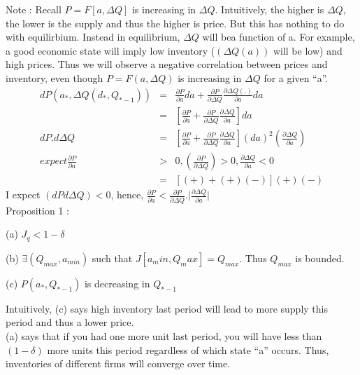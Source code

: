 Note : Recall $P=F[a, \Delta Q]$ is increasing in $\Delta Q$. Intuitively, the higher is $\Delta Q$, the lower is the supply and thus the higher is price. But this has nothing to do with equilirbium. Instead in equilibrium, $\Delta Q$ will bea function of a. For example, a good economic state will imply low inventory ($(\Delta Q(a))$ will be low) and high prices. Thus we will observe a negative correlation between prices and inventory, even though $P = F(a, \Delta Q)$ is increasing in  $\Delta Q$ for a given ``a''.\\

\begin{eqnarray*}
dP(a_*, \Delta Q (d_*, Q_{*-1})) &=& \frac{\partial P}{\partial a} da + \frac{\partial P}{\partial \Delta Q} \frac{\partial \Delta Q(.)}{\partial a} da\\
&=& \left[ \frac{\partial P}{\partial a} + \frac{\partial P}{\partial \Delta Q} \frac{\partial \Delta Q}{\partial a}\right] da\\
dP . d\Delta Q &=& \left[ \frac{\partial P}{\partial a} + \frac{\partial P}{\partial \Delta Q} \frac{\partial \Delta Q}{\partial a} \right] (da)^2 \left( \frac{\partial \Delta Q}{\partial a} \right)\\
expect \frac{\partial P}{\partial a} & > & 0, \left( \frac{\partial P}{\partial \Delta Q}\right) > 0, \frac{\partial \Delta Q}{\partial a} < 0\\
&=& [(+) + (+)(-)] (+) (-) 
\end{eqnarray*}
I expect $(dP d\Delta Q) < 0$, hence, $\frac{\partial P}{\partial a} < \frac{\partial P}{\partial \Delta Q} . \vert \frac{\partial \Delta Q}{\partial a} \vert$\\

Proposition 1 : 
\begin{list}{}{}
\item (a) $J_q < 1-\delta $
\item (b) $\exists(Q_{max}, a_{min})$ such that $J[a_min, Q_max] = Q_{max}$. Thus $Q_{max}$ is bounded.
\item (c) $P(a_*, Q_{*-1})$ is decreasing in $Q_{*-1}$
\end{list}

Intuitively, (c) says high inventory last period will lead to more supply this period and thus a lower price.\\

(a) says that if you had one more unit last period, you will have less than $(1-\delta)$ more units this period regardless of which state ``a'' occurs. Thus, inventories of different firms will converge over time.\\

